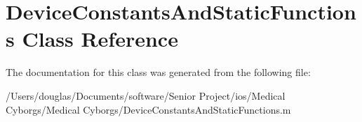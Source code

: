 \hypertarget{class_device_constants_and_static_functions}{\section{Device\-Constants\-And\-Static\-Functions Class Reference}
\label{class_device_constants_and_static_functions}
}


The documentation for this class was generated from the following file\-:\begin{DoxyCompactItemize}
\item 
/\-Users/douglas/\-Documents/software/\-Senior Project/ios/\-Medical Cyborgs/\-Medical Cyborgs/Device\-Constants\-And\-Static\-Functions.\-m\end{DoxyCompactItemize}
